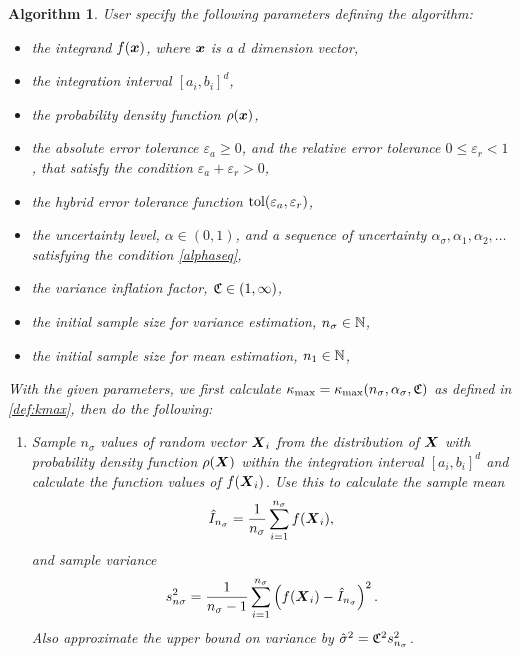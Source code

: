 \documentclass{iitthesis}
\newtheorem{algorithm}[theorem]{Algorithm}
\theoremstyle{definition}
\begin{document}
\begin{algorithm}\label{alg:cubMCg} 
User specify the following parameters defining the algorithm:
\begin{itemize}
\item the integrand $f(\boldsymbol{x})$, where $\boldsymbol{x}$ is a $d$ dimension vector, 
\item the integration interval $[a_i,b_i]^d$,
\item the probability density function $\rho(\boldsymbol{x})$,
\item the absolute error tolerance $\varepsilon_a \geq 0$, and the relative error tolerance $0 \leq \varepsilon_r <1$, that satisfy the condition $\varepsilon_a+\varepsilon_r >0$,
\item the hybrid error tolerance function $\operatorname{tol}(\varepsilon_a,\varepsilon_r)$,
\item the uncertainty level, $\alpha\in (0,1)$, and a sequence of uncertainty $ \alpha_\sigma, \alpha_1,  \alpha_2, \ldots$ satisfying the condition \eqref{alphaseq}, 
\item the variance inflation factor, $\mathfrak{C} \in (1,\infty)$, 
\item the initial sample size for variance estimation, $n_{\sigma} \in \mathbb{N}$,
\item the initial sample size for mean estimation, $n_1 \in \mathbb{N}$,
\end{itemize} 
With the given parameters, we first calculate $\kappa_{\max}=\kappa_{\max}(n_\sigma,\alpha_\sigma,\mathfrak{C})$ as defined in \eqref{def:kmax}, then do the following:
\begin{enumerate}
\item Sample $n_\sigma$ values of random vector $\boldsymbol{X}_i$ from the distribution of $\boldsymbol{X}$ with probability density function $\rho(\boldsymbol{X})$ within the integration interval $[a_i,b_i]^d$ and calculate the function values of $f(\boldsymbol{X}_i)$. Use this to calculate the sample mean $$\hat{I}_{n_\sigma} = \frac{1}{n_\sigma}\sum_{i=1}^{n_\sigma} f(\boldsymbol{X}_i),$$ and sample variance $$s_{n\sigma}^2 = \frac{1}{n_\sigma-1}\sum_{i=1}^{n_\sigma} \left(f(\boldsymbol{X}_i)-\hat{I}_{n_\sigma}\right)^2.$$ Also approximate the upper bound on variance by $\hat{\sigma}^2 = \mathfrak{C}^2 s^2_{n_\sigma}$. 


\end{enumerate}
\end{algorithm}
\end{document}
